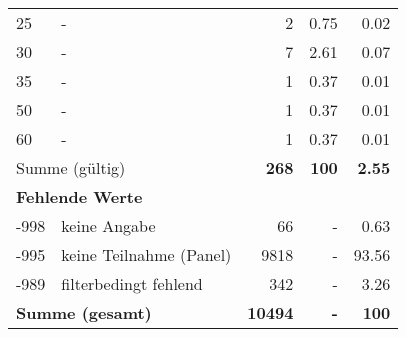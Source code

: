 \begin{longtable}{lXrrr}
     25 &
     \multicolumn{1}{X}{ -  } &


       \num{2} &
       \num[round-mode=places,round-precision=2]{0.75} &
         \num[round-mode=places,round-precision=2]{0.02} \\

     30 &
     \multicolumn{1}{X}{ -  } &


       \num{7} &
       \num[round-mode=places,round-precision=2]{2.61} &
         \num[round-mode=places,round-precision=2]{0.07} \\

     35 &
     \multicolumn{1}{X}{ -  } &


       \num{1} &
       \num[round-mode=places,round-precision=2]{0.37} &
         \num[round-mode=places,round-precision=2]{0.01} \\

     50 &
     \multicolumn{1}{X}{ -  } &


       \num{1} &
       \num[round-mode=places,round-precision=2]{0.37} &
         \num[round-mode=places,round-precision=2]{0.01} \\

     60 &
     \multicolumn{1}{X}{ -  } &


       \num{1} &
       \num[round-mode=places,round-precision=2]{0.37} &
         \num[round-mode=places,round-precision=2]{0.01} \\
     \midrule
     \multicolumn{2}{l}{Summe (gültig)} &
       \textbf{\num{268}} &
     \textbf{\num{100}} &
       \textbf{\num[round-mode=places,round-precision=2]{2.55}} \\
     \multicolumn{5}{l}{\textbf{Fehlende Werte}}\\
       -998 &
       keine Angabe &
         \num{66} &
        - &
         \num[round-mode=places,round-precision=2]{0.63} \\
       -995 &
       keine Teilnahme (Panel) &
         \num{9818} &
        - &
         \num[round-mode=places,round-precision=2]{93.56} \\
       -989 &
       filterbedingt fehlend &
         \num{342} &
        - &
         \num[round-mode=places,round-precision=2]{3.26} \\
     \midrule
     \multicolumn{2}{l}{\textbf{Summe (gesamt)}} &
          \textbf{\num{10494}} &
        \textbf{-} &
        \textbf{\num{100}} \\
     \bottomrule
     \end{longtable}
     

